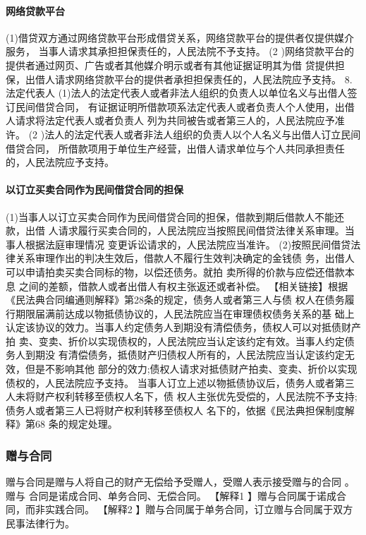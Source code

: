 \documentclass[UTF8,12pt]{ctexart}
\numberwithin{equation}{section} %
\numberwithin{figure}{section}
\numberwithin{table}{section}
\begin{document}
	
	\paragraph{网络贷款平台} (1)借贷双方通过网络贷款平台形成借贷关系，网络贷款平台的提供者仅提供媒介服务， 当事人请求其承担担保责任的，人民法院不予支持。
	(2 )网络贷款平台的提供者通过网页、广告或者其他媒介明示或者有其他证据证明其为借 贷提供担保，出借人请求网络贷款平台的提供者承担担保责任的，人民法院应予支持。
	8. 法定代表人 (1)法人的法定代表人或者非法人组织的负责人以单位名义与出借人签订民间借贷合同， 有证据证明所借款项系法定代表人或者负责人个人使用，出借人请求将法定代表人或者负责人 列为共同被告或者第三人的，人民法院应予准许。
	(2 )法人的法定代表人或者非法人组织的负责人以个人名义与出借人订立民间借贷合同， 所借款项用于单位生产经营，出借人请求单位与个人共同承担责任的，人民法院应予支持。
	
	\paragraph{以订立买卖合同作为民间借贷合同的担保}
	(1)当事人以订立买卖合同作为民间借贷合同的担保，借款到期后借款人不能还款，出借 人请求履行买卖合同的，人民法院应当按照民间借贷法律关系审理。当事人根据法庭审理情况 变更诉讼请求的，人民法院应当准许。
	(2)按照民间借贷法律关系审理作出的判决生效后，借款人不履行生效判决确定的金钱债 务，出借人可以申请拍卖买卖合同标的物，以偿还债务。就拍 卖所得的价款与应偿还借款本息 之间的差额，借款人或者出借人有权主张返还或者补偿。
	【相关链接】根据《民法典合同编通则解释》第28条的规定，债务人或者第三人与债 权人在债务履行期限届满前达成以物抵债协议的，人民法院应当在审理债权债务关系的基 础上认定该协议的效力。当事人约定债务人到期没有清偿债务，债权人可以对抵债财产拍 卖、变卖、折价以实现债权的，人民法院应当认定该约定有效。当事人约定债务人到期没 有清偿债务，抵债财产归债权人所有的，人民法院应当认定该约定无效，但是不影响其他 部分的效力;债权人请求对抵债财产拍卖、变卖、折价以实现债权的，人民法院应予支持。 当事人订立上述以物抵债协议后，债务人或者第三人未将财产权利转移至债权人名下，债 权人主张优先受偿的，人民法院不予支持;债务人或者第三人已将财产权利转移至债权人
	名下的，依据《民法典担保制度解释》第68 条的规定处理。
	
	\subsubsection{赠与合同}
	赠与合同是赠与人将自己的财产无偿给予受赠人，受赠人表示接受赠与的合同 。赠与 合同是诺成合同、单务合同、无偿合同。
	【解释1 】赠与合同属于诺成合同，而非实践合同。
	【解释2 】贈与合同属于单务合同，订立赠与合同属于双方民事法律行为。
	
\end{document}
